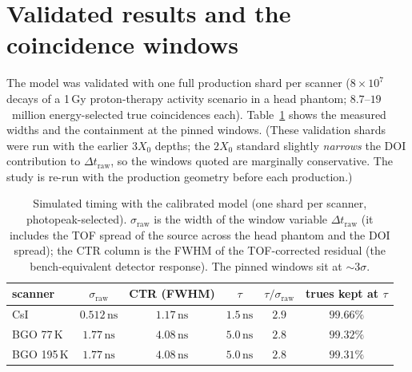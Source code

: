 \documentclass[11pt,a4paper]{article}
\newcommand{\ns}{\,\mathrm{ns}}
\begin{document}
\section{Validated results and the coincidence windows}
\label{sec:results}

The model was validated with one full production shard per scanner ($8\times10^7$ decays of a
1\,Gy proton-therapy activity scenario in a head phantom; $8.7$--$19$~million
energy-selected true coincidences each). Table~\ref{tab:results} shows the measured widths and
the containment at the pinned windows. (These validation shards were run with the earlier
$3X_0$ depths; the $2X_0$ standard slightly \emph{narrows} the DOI contribution to
$\Delta t_{\mathrm{raw}}$, so the windows quoted are marginally conservative. The study is
re-run with the production geometry before each production.)

\begin{table}[ht]
\centering
\caption{Simulated timing with the calibrated model (one shard per scanner,
photopeak-selected). $\sigma_{\mathrm{raw}}$ is the width of the window variable
$\Delta t_{\mathrm{raw}}$ (it includes the TOF spread of the source across the head phantom
and the DOI spread); the CTR column is the FWHM of the TOF-corrected residual (the
bench-equivalent detector response). The pinned windows sit at ${\sim}3\sigma$.}
\label{tab:results}
\vspace{2mm}
\begin{tabular}{lccccc}
\toprule
scanner & $\sigma_{\mathrm{raw}}$ & CTR (FWHM) & $\tau$ & $\tau/\sigma_{\mathrm{raw}}$ &
trues kept at $\tau$ \\
\midrule
CsI       & $0.512\ns$ & $1.17\ns$ & $1.5\ns$ & $2.9$ & $99.66\%$ \\
BGO 77\,K  & $1.77\ns$  & $4.08\ns$ & $5.0\ns$ & $2.8$ & $99.32\%$ \\
BGO 195\,K & $1.77\ns$  & $4.08\ns$ & $5.0\ns$ & $2.8$ & $99.31\%$ \\
\bottomrule
\end{tabular}
\end{table}
\end{document}
